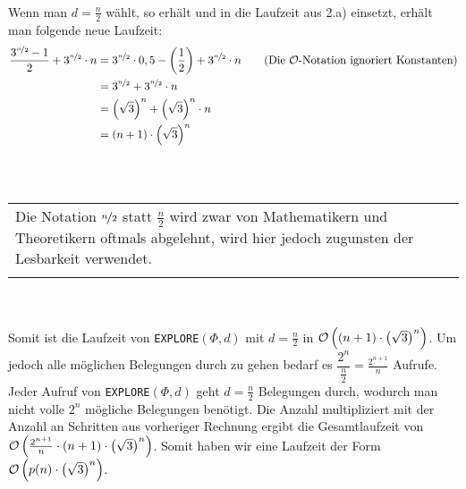 \documentclass[a4paper]{article}
\newenvironment{note}
{
	\\\hfill
	\\
	\hspace*{0cm} %
	\setlength\arrayrulewidth{4pt}\arrayrulecolor{lightgray!40!gray}
	\begin{tabular}{|p{\textwidth-2cm}}
	\vspace{0.1cm}
}
{
	\\
	\vspace{0.1cm}
	\end{tabular}
	\vspace{0.1cm}
	\\\hfill
	\vspace{0.1cm}
	\\
}
\newcommand{\explore}{\texttt{EXPLORE$(\Phi, d)$}\xspace}
\begin{document}
	\subsubsection{}
	Wenn man $d=\frac{n}{2}$ wählt, so erhält und in die Laufzeit aus 2.a) einsetzt, erhält man folgende neue Laufzeit:
	\begin{align*}
			\frac{3^{\nicefrac{n}{2}}-1}{2}+3^{\nicefrac{n}{2}}\cdot n
		&=	3^{\nicefrac{n}{2}}\cdot 0,5- \left(\frac{1}{2}\right)+3^{\nicefrac{n}{2}}\cdot n
			\tag{Die $\mathcal{O}$-Notation ignoriert Konstanten}\\
		&=	3^{\nicefrac{n}{2}}+3^{\nicefrac{n}{2}}\cdot n\\
		&=	\left(\sqrt{3}\right)^n+\left(\sqrt{3}\right)^n\cdot n\\
		&=	(n+1)\cdot \left(\sqrt{3}\right)^n
	\end{align*}
	\vspace{-2ex}
	\begin{note}
	Die Notation $\nicefrac{n}{2}$ statt $\frac{n}{2}$ wird zwar von Mathematikern und Theoretikern oftmals abgelehnt, wird hier jedoch zugunsten der Lesbarkeit verwendet.
	\end{note}
	Somit ist die Laufzeit von \explore mit $d=\frac{n}{2}$ in $\mathcal{O}\left((n+1)\cdot \left(\sqrt{3}\right)^n\right)$.\n
	Um jedoch alle möglichen Belegungen durch zu gehen bedarf es $\dfrac{2^n}{\frac{n}{2}}=\frac{2^{n+1}}{n}$ Aufrufe. Jeder Aufruf von \explore geht $d=\frac{n}{2}$ Belegungen durch, wodurch man nicht volle $2^n$ mögliche Belegungen benötigt.\n
	Die Anzahl multipliziert mit der Anzahl an Schritten aus vorheriger Rechnung ergibt die Gesamtlaufzeit von $\mathcal{O}\left(\frac{2^{n+1}}{n}\cdot (n+1)\cdot \left(\sqrt{3}\right)^n\right)$.\n
	Somit haben wir eine Laufzeit der Form $\mathcal{O}\left(p(n)\cdot \left(\sqrt{3}\right)^n\right)$.
\end{document}

